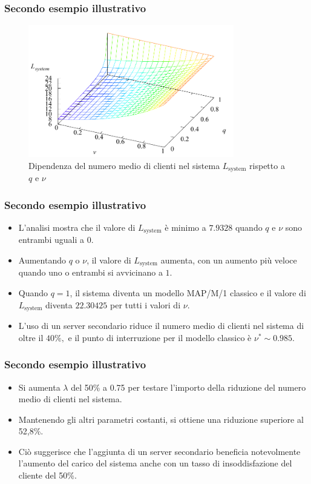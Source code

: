 \documentclass{beamer}
\begin{document}
\begin{frame}
    \frametitle{Secondo esempio illustrativo}
    \begin{figure}[h]
        \centering
        \includegraphics[width=0.8\textwidth]{qUQVrEZ.png}
        \caption{Dipendenza del numero medio di clienti nel sistema $L_{\mathrm{system}}$ rispetto a $q$ e $\nu$}
    \end{figure}
\end{frame}


\begin{frame}
    \frametitle{Secondo esempio illustrativo}
    \begin{itemize}
        \item L'analisi mostra che il valore di $L_\mathrm{system}$ è minimo a $7.9328$ quando $q$ e $\nu$ sono entrambi uguali a $0$.
        \item Aumentando $q$ o $\nu$, il valore di $L_\mathrm{system}$ aumenta, con un aumento più veloce quando uno o entrambi si avvicinano a $1$.
        \item Quando $q=1$, il sistema diventa un modello MAP/M/1 classico e il valore di $L_\mathrm{system}$ diventa $22.30425$ per tutti i valori di $\nu$.
        \item L'uso di un server secondario riduce il numero medio di clienti nel sistema di oltre il $40\%,$ e il punto di interruzione per il modello classico è $\nu^* \sim 0.985$.
    \end{itemize}
\end{frame}


\begin{frame}
    \frametitle{Secondo esempio illustrativo}
    \begin{itemize}
        \item Si aumenta $\lambda$ del 50\% a 0.75 per testare l'importo della riduzione del numero medio di clienti nel sistema.
        \item Mantenendo gli altri parametri costanti, si ottiene una riduzione superiore al 52,8\%.
        \item Ciò suggerisce che l'aggiunta di un server secondario beneficia notevolmente l'aumento del carico del sistema anche con un tasso di insoddisfazione del cliente del 50\%.
    \end{itemize}
\end{frame}
\end{document}
